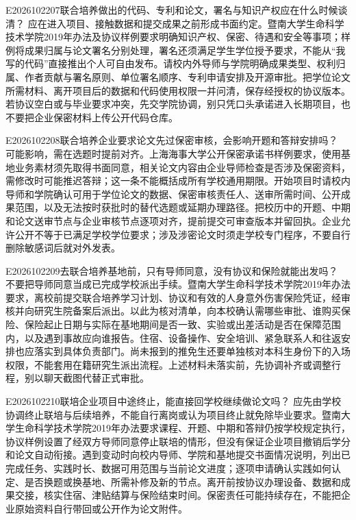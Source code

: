 \begin{qa}{E2026102207}{联合培养做出的代码、专利和论文，署名与知识产权应在什么时候谈清？}
应在进入项目、接触数据和提交成果之前形成书面约定。暨南大学生命科学技术学院2019年办法及协议样例要求明确知识产权、保密、待遇和安全等事项；样例将成果归属与论文署名分别处理，署名还须满足学生学位授予要求，不能从“我写的代码”直接推出个人可自由发布。请校内外导师与学院明确成果类型、权利归属、作者贡献与署名原则、单位署名顺序、专利申请安排及开源审批。把学位论文所需材料、离开项目后的数据和代码使用权限一并问清，保存经授权的协议版本。若协议空白或与毕业要求冲突，先交学院协调，别只凭口头承诺进入长期项目，也不要把企业保密材料上传公开代码仓库。
\end{qa}

\begin{qa}{E2026102208}{联合培养企业要求论文先过保密审核，会影响开题和答辩安排吗？}
可能影响，需在选题时提前对齐。上海海事大学公开保密承诺书样例要求，使用基地业务素材须先取得书面同意，相关论文内容由企业导师检查是否涉及保密资料，需修改时可能推迟答辩；这一条不能概括成所有学校通用期限。开始项目时请校内导师和学院确认可用于学位论文的数据、保密审核责任人、送审所需时间、公开成果范围，以及无法按时获批时的替代选题或延期办理路径。把校历中的开题、中期和论文送审节点与企业审核节点逐项对齐，提前提交可审查版本并留回执。企业允许公开不等于已满足学校学位要求；涉及涉密论文时须走学校专门程序，不要自行删除敏感词后就对外发表。
\end{qa}

\begin{qa}{E2026102209}{去联合培养基地前，只有导师同意，没有协议和保险就能出发吗？}
不要把导师同意当成已完成学校派出手续。暨南大学生命科学技术学院2019年办法要求，离校前提交联合培养学习计划、协议和有效的人身意外伤害保险凭证，经审核并向研究生院备案后派出。以此为核对清单，向本校确认需哪些审批、谁购买保险、保险起止日期与实际在基地期间是否一致、实验或出差活动是否在保障范围内，以及遇到事故应向谁报告。住宿、设备操作、安全培训、紧急联系人和往返安排也应落实到具体负责部门。尚未报到的推免生还要单独核对本科生身份下的入场权限，不能套用在籍研究生派出流程。上述材料未落实前，先协调补齐或调整行程，别以聊天截图代替正式审批。
\end{qa}

\begin{qa}{E2026102210}{联培企业项目中途终止，能直接回学校继续做论文吗？}
应先由学校协调终止联培与后续培养，不能自行离岗或认为项目终止就免除毕业要求。暨南大学生命科学技术学院2019年办法要求课程、开题、中期和答辩仍按学校规定执行，协议样例设置了经双方导师同意停止联培的情形，但没有保证企业项目撤销后学分和论文自动衔接。遇到变动时向校内导师、学院和基地提交书面情况说明，列出已完成任务、实践时长、数据可用范围与当前论文进度；逐项申请确认实践如何认定、是否换题或换基地、所需补修及新的节点。离开前按协议办理设备、数据和成果交接，核实住宿、津贴结算与保险结束时间。保密责任可能持续存在，不能把企业原始资料自行带回或公开作为论文附件。
\end{qa}

